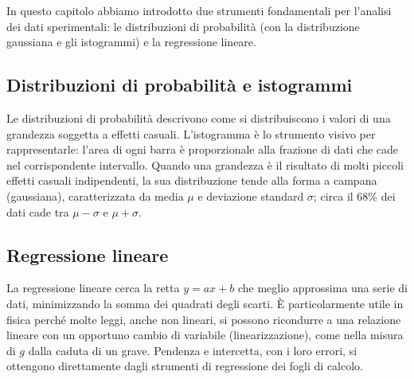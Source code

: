 In questo capitolo abbiamo introdotto due strumenti fondamentali per l'analisi dei dati sperimentali: le distribuzioni di probabilità (con la distribuzione gaussiana e gli istogrammi) e la regressione lineare.

\subsection{Distribuzioni di probabilità e istogrammi}
Le distribuzioni di probabilità descrivono come si distribuiscono i valori di una grandezza soggetta a effetti casuali. L'istogramma è lo strumento visivo per rappresentarle: l'area di ogni barra è proporzionale alla frazione di dati che cade nel corrispondente intervallo. Quando una grandezza è il risultato di molti piccoli effetti casuali indipendenti, la sua distribuzione tende alla forma a campana (gaussiana), caratterizzata da media $\mu$ e deviazione standard $\sigma$; circa il 68\% dei dati cade tra $\mu-\sigma$ e $\mu+\sigma$.

\subsection{Regressione lineare}
La regressione lineare cerca la retta $y = a x + b$ che meglio approssima una serie di dati, minimizzando la somma dei quadrati degli scarti. È particolarmente utile in fisica perché molte leggi, anche non lineari, si possono ricondurre a una relazione lineare con un opportuno cambio di variabile (linearizzazione), come nella misura di $g$ dalla caduta di un grave. Pendenza e intercetta, con i loro errori, si ottengono direttamente dagli strumenti di regressione dei fogli di calcolo.




